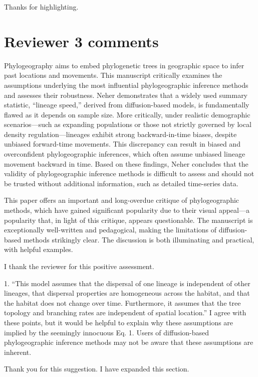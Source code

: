 \documentclass[11pt, oneside]{article}   	%
\newcommand{\response}[1]{{\color{black}{\bf Response:} #1}}
\begin{document}
\response{Thanks for highlighting.}



\section*{Reviewer 3 comments}

Phylogeography aims to embed phylogenetic trees in geographic space to infer past locations and movements. This manuscript critically examines the assumptions underlying the most influential phylogeographic inference methods and assesses their robustness. Neher demonstrates that a widely used summary statistic, “lineage speed,” derived from diffusion-based models, is fundamentally flawed as it depends on sample size. More critically, under realistic demographic scenarios—such as expanding populations or those not strictly governed by local density regulation—lineages exhibit strong backward-in-time biases, despite unbiased forward-time movements. This discrepancy can result in biased and overconfident phylogeographic inferences, which often assume unbiased lineage movement backward in time. Based on these findings, Neher concludes that the validity of phylogeographic inference methods is difficult to assess and should not be trusted without additional information, such as detailed time-series data.

This paper offers an important and long-overdue critique of phylogeographic methods, which have gained significant popularity due to their visual appeal—a popularity that, in light of this critique, appears questionable. The manuscript is exceptionally well-written and pedagogical, making the limitations of diffusion-based methods strikingly clear. The discussion is both illuminating and practical, with helpful examples.


\response{I thank the reviewer for this positive assessment.}

1.  ``This model assumes that the dispersal of one lineage is independent of other lineages, that dispersal properties are homogeneous across the habitat, and that the habitat does not change over time. Furthermore, it assumes that the tree topology and branching rates are independent of spatial location.'' I agree with these points, but it would be helpful to explain why these assumptions are implied by the seemingly innocuous Eq. 1. Users of diffusion-based phylogeographic inference methods may not be aware that these assumptions are inherent.

\response{Thank you for this suggestion. I have expanded this section.}
\end{document}
